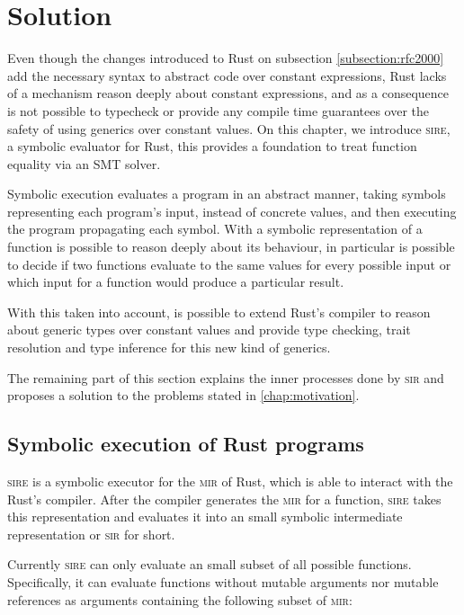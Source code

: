 \chapter{Solution}
\label{chap:solution}

Even though the changes introduced to Rust on subsection
\ref{subsection:rfc2000} add the necessary syntax to abstract code over
constant expressions, Rust lacks of a mechanism reason deeply about constant
expressions, and as a consequence is not possible to typecheck or provide any
compile time guarantees over the safety of using generics over constant values.
On this chapter, we introduce \textsc{sire}, a symbolic evaluator for Rust,
this provides a foundation to treat function equality via an SMT solver. 

Symbolic execution evaluates a program in an abstract manner, taking symbols
representing each program's input, instead of concrete values, and then
executing the program propagating each symbol. With a symbolic representation
of a function is possible to reason deeply about its behaviour, in particular
is possible to decide if two functions evaluate to the same values for every
possible input or which input for a function would produce a particular result.

With this taken into account, is possible to extend Rust's compiler to
reason about generic types over constant values and provide type checking,
trait resolution and type inference for this new kind of generics.

The remaining part of this section explains the inner processes done by
\textsc{sir} and proposes a solution to the problems stated in
\ref{chap:motivation}.

\section{Symbolic execution of Rust programs}
\label{section:symbolic_execution}

\textsc{sire} is a symbolic executor for the \textsc{mir} of Rust, which is
able to interact with the Rust's compiler. After the compiler generates the
\textsc{mir} for a function, \textsc{sire} takes this representation and
evaluates it into an small symbolic intermediate representation or \textsc{sir}
for short.

Currently \textsc{sire} can only evaluate an small subset of all possible
functions. Specifically, it can evaluate functions without mutable arguments nor
mutable references as arguments containing the following subset of \textsc{mir}:

